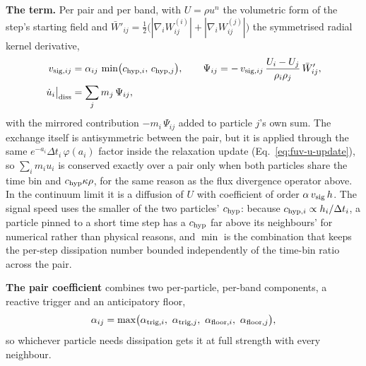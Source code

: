 \textbf{The term.} Per pair and per band, with $U = \rho u^n$ the
volumetric form of the step's starting field and $\bar W'_{ij} =
\tfrac12\big(|\nabla_i W_{ij}^{(i)}| + |\nabla_i W_{ij}^{(j)}|\big)$
the symmetrised radial kernel derivative,
\begin{equation}
\begin{aligned}
  v_{{\rm sig},ij} &= \alpha_{ij}\,\min\!\big(c_{{\rm hyp},i},\,c_{{\rm hyp},j}\big) ,
  \qquad
  \Psi_{ij} = -\,v_{{\rm sig},ij}\,\frac{U_i - U_j}{\rho_i\rho_j}\,\bar W'_{ij} , \\
  \dot u_i\big|_{\rm diss} &= \sum_j m_j\,\Psi_{ij} ,
\end{aligned}
  \label{eq:fuv-diss-formula}
\end{equation}
with the mirrored contribution $-m_i\,\Psi_{ij}$ added to particle
$j$'s own sum. The exchange itself is antisymmetric between the pair,
but it is applied through the same $e^{-a_i}\Delta t_i\,\varphi(a_i)$
factor inside the relaxation update (Eq.~\ref{eq:fuv-u-update}), so $\sum_i m_i u_i$
is conserved exactly over a pair only when both particles share the time
bin and $c_{\rm hyp}\kappa\rho$, for the same reason as the flux
divergence operator above. In the continuum
limit it is a diffusion of $U$ with coefficient of order $\alpha\,v_{\rm
sig}\,h$. The signal speed uses the smaller of the two particles'
$c_{\rm hyp}$: because $c_{{\rm hyp},i}\propto h_i/\Delta t_i$, a
particle pinned to a short time step has a $c_{\rm hyp}$ far above its
neighbours' for numerical rather than physical reasons, and $\min$ is
the combination that keeps the per-step dissipation number bounded
independently of the time-bin ratio across the pair.

\textbf{The pair coefficient} combines two per-particle, per-band
components, a reactive trigger and an anticipatory floor,
\begin{equation}
  \alpha_{ij} = \max\!\big(\alpha_{{\rm trig},i},\ \alpha_{{\rm trig},j},\
                            \alpha_{{\rm floor},i},\ \alpha_{{\rm floor},j}\big) ,
  \label{eq:fuv-diss-alpha-pair}
\end{equation}
so whichever particle needs dissipation gets it at full strength with
every neighbour.

